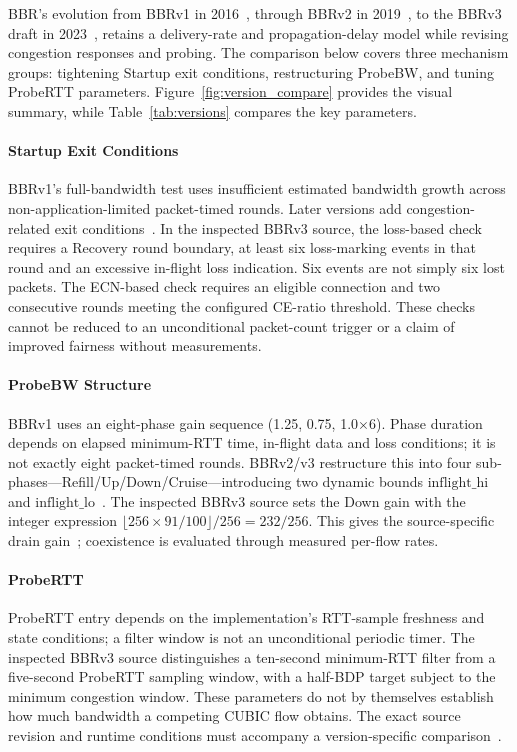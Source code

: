 \documentclass[a4paper,fleqn]{cas-sc}
\begin{document}
BBR's evolution from BBRv1 in 2016~\citep{cardwell2017bbr}, through BBRv2 in
2019~\citep{cardwell2019bbrv2}, to the BBRv3 draft in
2023~\citep{cardwell2023bbrv3}, retains a delivery-rate and propagation-delay model while revising
congestion responses and probing. The comparison below covers three
mechanism groups: tightening Startup exit conditions, restructuring
ProbeBW, and tuning ProbeRTT parameters. Figure~\ref{fig:version_compare}
provides the visual summary, while Table~\ref{tab:versions} compares the key
parameters.

\paragraph{Startup Exit Conditions}
BBRv1's full-bandwidth test uses insufficient estimated bandwidth growth
across non-application-limited packet-timed rounds. Later versions add
congestion-related exit conditions~\citep{cardwell2019bbrv2,cardwell2023bbrv3}.
In the inspected BBRv3 source, the loss-based check requires a Recovery
round boundary, at least six loss-marking events in that round and an
excessive in-flight loss indication. Six events are not simply six lost
packets. The ECN-based check requires an eligible connection and two
consecutive rounds meeting the configured CE-ratio threshold. These checks
cannot be reduced to an unconditional packet-count trigger or a claim of
improved fairness without measurements.

\paragraph{ProbeBW Structure}
BBRv1 uses an eight-phase gain sequence (1.25, 0.75, 1.0$\times$6).
Phase duration depends on elapsed minimum-RTT time, in-flight data and loss
conditions; it is not exactly eight packet-timed rounds. BBRv2/v3 restructure this into four sub-phases---Refill/Up/Down/Cruise---introducing
two dynamic bounds $\mathrm{inflight\_hi}$ and
$\mathrm{inflight\_lo}$~\citep{cardwell2019bbrv2}. The inspected BBRv3 source sets the Down gain with the integer expression
$\lfloor256\times91/100\rfloor/256=232/256$. This gives the source-specific drain gain~\citep{cardwell2023bbrv3};
coexistence is evaluated through measured per-flow rates.

\paragraph{ProbeRTT}
ProbeRTT entry depends on the implementation's RTT-sample freshness and
state conditions; a filter window is not an unconditional periodic timer.
The inspected BBRv3 source distinguishes a ten-second minimum-RTT filter
from a five-second ProbeRTT sampling window, with a half-BDP target
subject to the minimum congestion window. These parameters do not by
themselves establish how much bandwidth a competing CUBIC flow obtains.
The exact source revision and runtime conditions must accompany a
version-specific comparison~\citep{cardwell2019bbrv2,cardwell2023bbrv3}.
\end{document}
